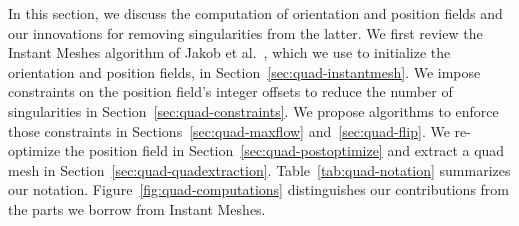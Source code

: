 In this section, we discuss the computation of orientation and position fields and our innovations for removing singularities from the latter. We first review the Instant Meshes algorithm of Jakob et al.~\cite{jakob2015instant}, which we use to initialize the orientation and position fields, in Section~\ref{sec:quad-instantmesh}. We impose constraints on the position field's integer offsets to reduce the number of singularities in Section~\ref{sec:quad-constraints}. We propose algorithms to enforce those constraints in Sections~\ref{sec:quad-maxflow} and~\ref{sec:quad-flip}. We re-optimize the position field in Section~\ref{sec:quad-postoptimize} and extract a quad mesh in Section~\ref{sec:quad-quadextraction}. Table~\ref{tab:quad-notation} summarizes our notation. Figure~\ref{fig:quad-computations} distinguishes our contributions from the parts we borrow from Instant Meshes.

